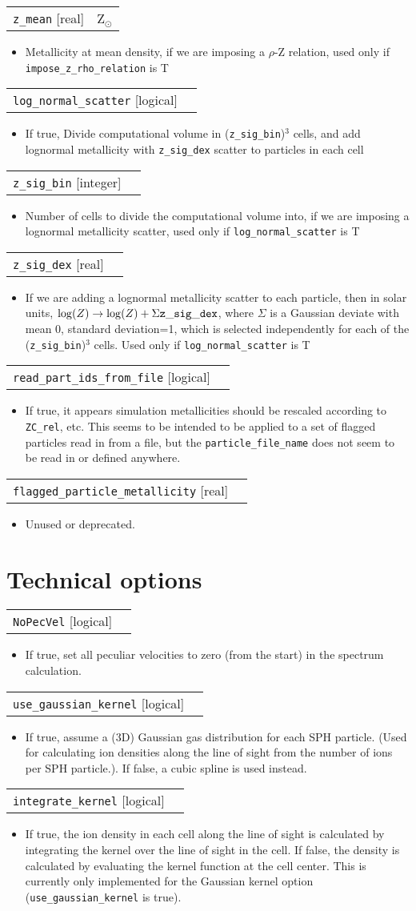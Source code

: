 \documentclass{report}
\makeatletter
\newcommand{\paramdefinition}[3]{
\begin{tabular*}{\textwidth}{l@{\extracolsep{\fill}}r}
		{\tt #1} [{\sc #2}]& #3 \\
\end{tabular*}}
\newcommand{\paramdescription}[1]{
\begin{itemize}
\item #1
\end{itemize}\vspace{0.2cm}}
\newcommand{\param}[1]{{\tt #1}}
\makeatother
\begin{document}
\paramdefinition{z\_mean}{real}{Z$_{\odot}$}
\paramdescription{Metallicity at mean density, if we are imposing a $\rho$-Z relation, used only if {\tt impose\_z\_rho\_relation} is T}

\paramdefinition{log\_normal\_scatter}{logical}{ }
\paramdescription{If true, Divide computational volume in ({\tt z\_sig\_bin})$^3$ cells, and add lognormal metallicity with {\tt z\_sig\_dex} scatter to particles in each cell}

\paramdefinition{z\_sig\_bin}{integer}{}
\paramdescription{Number of cells to divide the computational volume into, if we are imposing a lognormal metallicity scatter, used only if {\tt log\_normal\_scatter} is T}

\paramdefinition{z\_sig\_dex}{real}{}
\paramdescription{If we are adding a lognormal metallicity scatter to each particle, then in solar units, $\log(Z) \rightarrow \log(Z)+\Sigma {\tt z\_sig\_dex}$, where $\Sigma$ is a Gaussian deviate with mean 0, standard deviation=1, which is selected independently for each of the ({\tt z\_sig\_bin})$^3$ cells. Used only if {\tt log\_normal\_scatter} is T}

\paramdefinition{read\_part\_ids\_from\_file}{logical}{}
\paramdescription{If true, it appears simulation metallicities should be rescaled according to \param{ZC\_rel}, etc. This seems to be intended to be applied to a set of flagged particles read in from a file, but the \param{particle\_file\_name} does not seem to be read in or defined anywhere.}

\paramdefinition{flagged\_particle\_metallicity}{real}{}
\paramdescription{Unused or deprecated.}



\section{Technical options}

\paramdefinition{NoPecVel}{logical}{}
\paramdescription{If true, set all peculiar velocities to zero (from the start) in the spectrum calculation.}

\paramdefinition{use\_gaussian\_kernel}{logical}{}
\paramdescription{If true, assume a (3D) Gaussian gas distribution for each SPH particle. (Used for calculating ion densities along the line of sight from the number of ions per SPH particle.). If false, a cubic spline is used instead.}

\paramdefinition{integrate\_kernel}{logical}{}
\paramdescription{If true, the ion density in each cell along the line of sight is calculated by integrating the kernel over the line of sight in the cell. If false, the density is calculated by evaluating the kernel function at the cell center. This is currently only implemented for the Gaussian kernel option (\param{use\_gaussian\_kernel} is true).}
\end{document}
